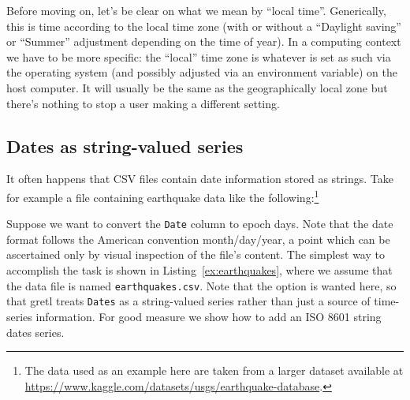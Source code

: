 Before moving on, let's be clear on what we mean by ``local time''.
Generically, this is time according to the local time zone (with or
without a ``Daylight saving'' or ``Summer'' adjustment depending on
the time of year). In a computing context we have to be more specific:
the ``local'' time zone is whatever is set as such via the operating
system (and possibly adjusted via an environment variable) on the host
computer. It will usually be the same as the geographically local zone
but there's nothing to stop a user making a different setting.

\subsection{Dates as string-valued series}

It often happens that CSV files contain date information stored as
strings. Take for example a file containing earthquake data like the
following:\footnote{The data used as an example here are taken from a
  larger dataset available at
  \url{https://www.kaggle.com/datasets/usgs/earthquake-database}.}

\begin{center}
\end{center}

Suppose we want to convert the \texttt{Date} column to epoch
days. Note that the date format follows the American convention
month/day/year, a point which can be ascertained only by visual
inspection of the file's content. The simplest way to accomplish the
task is shown in Listing~\ref{ex:earthquakes}, where we assume that the
data file is named \texttt{earthquakes.csv}. Note that the
 option is wanted here, so that gretl treats
\texttt{Dates} as a string-valued series rather than just a source of
time-series information. For good measure we show how to add an ISO
8601 string dates series.

